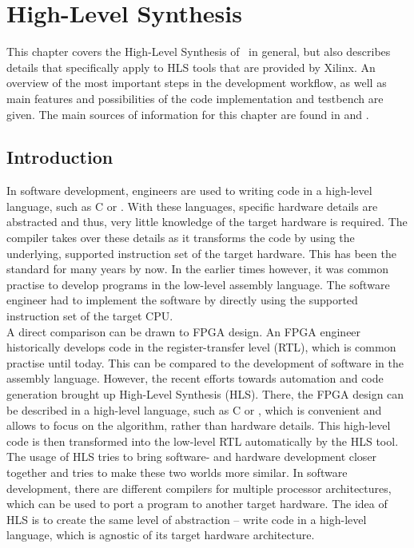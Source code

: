 \chapter{High-Level Synthesis}
\label{cha:HLS}

This chapter covers the High-Level Synthesis of \cplusplus\ in general, but also describes details that specifically apply to HLS tools that are provided by Xilinx.
An overview of the most important steps in the development workflow, as well as main features and possibilities of the code implementation and testbench are given.
The main sources of information for this chapter are found in \cite{VivadoUgHLSIntro} and \cite{VivadoUgHLS}.

\section{Introduction}

In software development, engineers are used to writing code in a high-level language, such as C or \cplusplus.
With these languages, specific hardware details are abstracted and thus, very little knowledge of the target hardware is required.
The compiler takes over these details as it transforms the code by using the underlying, supported instruction set of the target hardware.
This has been the standard for many years by now.
In the earlier times however, it was common practise to develop programs in the low-level assembly language.
The software engineer had to implement the software by directly using the supported instruction set of the target CPU.\\

A direct comparison can be drawn to FPGA design.
An FPGA engineer historically develops code in the register-transfer level (RTL), which is common practise until today.
This can be compared to the development of software in the assembly language.
However, the recent efforts towards automation and code generation brought up High-Level Synthesis (HLS).
There, the FPGA design can be described in a high-level language, such as C or \cplusplus, which is convenient and allows to focus on the algorithm, rather than hardware details.
This high-level code is then transformed into the low-level RTL automatically by the HLS tool.\\

The usage of HLS tries to bring software- and hardware development closer together and tries to make these two worlds more similar.
In software development, there are different compilers for multiple processor architectures, which can be used to port a program to another target hardware.
The idea of HLS is to create the same level of abstraction -- write code in a high-level language, which is agnostic of its target hardware architecture.\\

